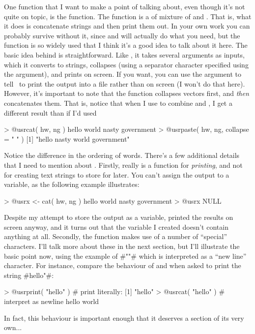 
One function that I want to make a point of talking about, even though it's not quite on topic, is the  function. The  function is a of mixture of   and . That is, what it does is concatenate strings and then print them out. In your own work you can probably survive without it, since  and  will actually do what you need, but the  function is so widely used that I think it's a good idea to talk about it here. The basic idea behind  is straightforward. Like , it takes several arguments as inputs, which it converts to strings, collapses (using a separator character specified using the  argument), and prints on screen. If you want, you can use the  argument to tell \R\ to print the output into a file rather than on screen (I won't do that here). However, it's important to note that the  function collapses vectors first, and {\it then} concatenates them. That is, notice that when I use  to combine  and , I get a different result than if I'd used 
\begin{rblock1}
> @usr{cat( hw, ng )}
hello world nasty government
> @usr{paste( hw, ng, collapse = " " )}
[1] "hello nasty world government"
\end{rblock1} 
Notice the difference in the ordering of words. There's a few additional details that I need to mention about . Firstly,  really is a function for {\it printing}, and not for creating text strings to store for later. You can't assign the output to a variable, as the following example illustrates:
\begin{rblock1}
> @usr{x <- cat( hw, ng )}   
hello world nasty government
> @usr{x}  
NULL
\end{rblock1}
Despite my attempt to store the output as a variable,  printed the results on screen anyway, and it turns out that the variable I created doesn't contain anything at all. Secondly, the  function makes use of a number of ``special'' characters. I'll talk more about these in the next section, but I'll illustrate the basic point now, using the example of \rtextverb#"\n"# which is interpreted as a ``new line'' character. For instance, compare the behaviour of  and  when asked to print the string \rtextverb#hello\nworld"#:
\begin{rblock1}
> @usr{print( "hello\nworld" )}  # print literally:
[1] "hello\nworld"
> @usr{cat( "hello\nworld" )}  # interpret as newline
hello
world
\end{rblock1}
In fact, this behaviour is important enough that it deserves a section of its very own...

